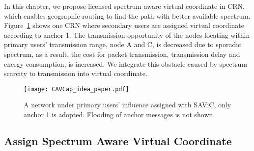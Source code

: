 In this chapter, we propose licensed spectrum aware virtual coordinate in CRN, which enables geographic routing to find the path with better available spectrum.
Figure~\ref{fig:SA-VCapidea} shows one CRN where secondary users are assigned virtual coordinate according to anchor 1.
The transmission opportunity of the nodes locating within primary users' transmission range, \eg node A and C, is decreased due to sporadic spectrum, as a result, the cost for packet transmission, \eg transmission delay and energy consumption, is increased.
We integrate this obstacle caused by spectrum scarcity to transmission into virtual coordinate.


\begin{figure}
\centering
\texttt{[image: CAVCap\_idea\_paper.pdf]}
\caption{A network under primary users' influence assigned with SAViC, only anchor 1 is adopted. Flooding of anchor messages is not shown.}
\label{fig:SA-VCapidea}
\end{figure}


\subsection{Assign Spectrum Aware Virtual Coordinate}

